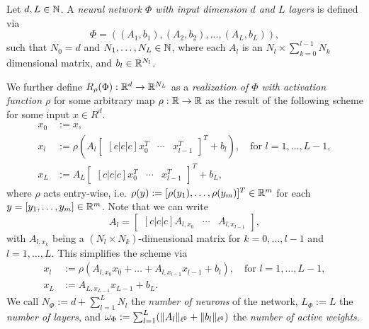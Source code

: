 \begin{definition} \label{def: neural network}
    Let $d, L \in \mathbb{N}$. A \emph{neural network $\Phi$ with input dimension $d$ and $L$ layers} is defined via 
    \begin{equation*}
        \Phi = ((A_1, b_1), (A_2, b_2), \dots, (A_L, b_L)),
    \end{equation*} 
    such that $N_0 = d$ and $N_1, \dots, N_L \in \mathbb{N}$, where each $A_l$ is an $N_l \times \sum_{k=0}^{l-1} N_k$ dimensional
    matrix, and $b_l \in \mathbb{R}^{N_l}$.
    
    We further define $R_\rho(\Phi): \mathbb{R}^d \to \mathbb{R}^{N_L}$ as a \emph{realization of $\Phi$ with activation function $\rho$} for some
    arbitrary map $\rho : \mathbb{R} \to \mathbb{R}$ as the result of the following scheme for some input $x \in R^d$.
    \begin{align*}
        x_0 &:= x, \\
        x_l &:= \rho \left( A_l \begin{bmatrix}[c|c|c]x_0^T & \cdots & x_{l-1}^T\end{bmatrix}^T + b_l \right), \quad \mbox{for } l = 1, \dots, L-1, \\
        x_L &:= A_L \begin{bmatrix}[c|c|c]x_0^T & \cdots & x_{l-1}^T\end{bmatrix}^T + b_L,
    \end{align*}
    where $\rho$ acts entry-wise, i.e. $\rho(y) := [\rho(y_1), \dots, \rho(y_m)]^T \in \mathbb{R}^m$ for each 
    $y = [y_1, \dots, y_m] \in \mathbb{R}^m$. Note that we can write
    \begin{equation*}
        A_l = \begin{bmatrix}[c|c|c]A_{l, x_0} & \cdots & A_{l, x_{l-1}}\end{bmatrix},
    \end{equation*}
    with $A_{l, x_k}$ being a $(N_l \times N_k)$-dimensional matrix for $k = 0, \dots, l-1$ and $l = 1, \dots, L$.
    This simplifies the scheme via
    \begin{align*}
        x_l &:= \rho \left( A_{l, x_0} x_0 + \dots + A_{l, x_{l-1}} x_{l-1} + b_l \right), \quad \mbox{for } l = 1, \dots, L-1, \\
        x_L &:= A_{L, x_{L-1}} x_{L-1} + b_L.
    \end{align*}
    We call $N_{\Phi} := d + \sum_{l=1}^L N_l$ the \emph{number of neurons} of the network, $L_{\Phi} := L$
    the \emph{number of layers}, and $\omega_\Phi := \sum_{l=1}^L (\lVert A_l \rVert_{\ell^0} + \lVert b_l \rVert_{\ell^0})$ the \emph{number 
    of active weights}.
\end{definition}

